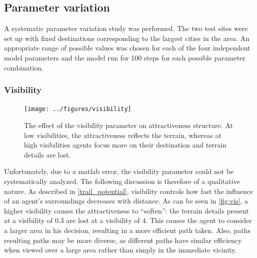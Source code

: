 \documentclass[a4paper, DIV11, abstracton]{scrartcl}
\begin{document}
\subsection{Parameter variation}
A systematic parameter variation study was performed. The two test sites were set up with fixed destinations corresponding to the largest cities in the area. An appropriate range of possible values was chosen for each of the four independent model parameters and the model run for 100 steps for each possible parameter combination. 

\subsubsection{Visibility}
\begin{figure}[tbp]
	\texttt{[image: ../figures/visibility]}
	\caption{The effect of the visibility parameter on attractiveness structure. At low visibilities, the attractiveness reflects the terrain, whereas at high visibilities agents focus more on their destination and terrain details are lost.}
	\label{fig:vis}
\end{figure}
Unfortunately, due to a {\sc matlab} error, the visibility parameter could not be systematically analyzed. The following discussion is therefore of a qualitative nature. As described in \autoref{trail_potential}, visibility controls how fast the influence of an agent's surroundings decreases with distance. As can be seen in \autoref{fig:vis}, a higher visibility causes the attractiveness to ``soften'': the terrain details present at a visibility of 0.3 are lost at a visibility of 4. This causes the agent to consider a larger area in his decision, resulting in a more efficient path taken. Also, paths resulting paths may be more diverse, as different paths have similar efficiency when viewed over a large area rather than simply in the immediate vicinity.
\end{document}
